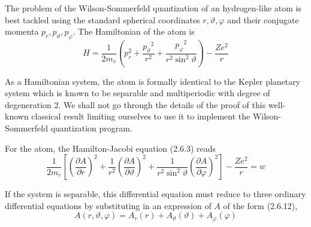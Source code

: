 \documentclass{article}
\begin{document}
The problem of the Wilson-Sommerfeld quantization of an hydrogen-like atom is best tackled using the standard spherical coordinates $r, \vartheta, \varphi$ and their conjugate momenta $p_{r}, p_{\vartheta}, p_{\varphi}$. The Hamiltonian of the atom is
$$
\begin{equation*}
H=\frac{1}{2 m_{r}}\left(p_{r}^{2}+\frac{p_{\vartheta}{ }^{2}}{r^{2}}+\frac{p_{\varphi}{ }^{2}}{r^{2} \sin ^{2} \vartheta}\right)-\frac{Z e^{2}}{r} \tag{2.8.1}
\end{equation*}
$$

As a Hamiltonian system, the atom is formally identical to the Kepler planetary system which is known to be separable and multiperiodic with degree of degeneration 2. We shall not go through the details of the proof of this well-known classical result limiting ourselves to use it to implement the Wilson-Sommerfeld quantization program.

For the atom, the Hamilton-Jacobi equation (2.6.3) reads
$$
\begin{equation*}
\frac{1}{2 m_{r}}\left[\left(\frac{\partial A}{\partial r}\right)^{2}+\frac{1}{r^{2}}\left(\frac{\partial A}{\partial \vartheta}\right)^{2}+\frac{1}{r^{2} \sin ^{2} \vartheta}\left(\frac{\partial A}{\partial \varphi}\right)^{2}\right]-\frac{Z e^{2}}{r}=w \tag{2.8.2}
\end{equation*}
$$

If the system is separable, this differential equation must reduce to three ordinary differential equations by substituting in an expression of $A$ of the form (2.6.12),
$$
\begin{equation*}
A(r, \vartheta, \varphi)=A_{r}(r)+A_{\vartheta}(\vartheta)+A_{\varphi}(\varphi) \tag{2.8.3}
\end{equation*}
$$
\end{document}
